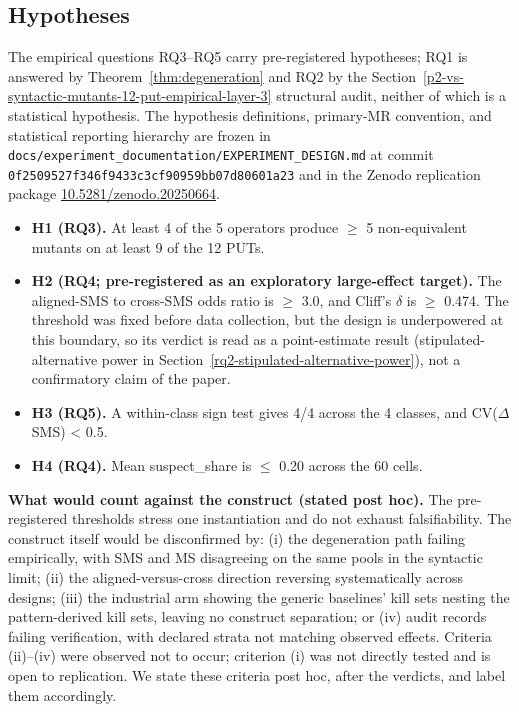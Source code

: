 \documentclass[manuscript,screen,review]{acmart}
\begin{document}
\subsection{Hypotheses}\label{hypotheses}

The empirical questions RQ3--RQ5 carry pre-registered hypotheses; RQ1 is
answered by Theorem~\ref{thm:degeneration} and RQ2 by the Section~\ref{p2-vs-syntactic-mutants-12-put-empirical-layer-3} structural audit, neither of
which is a statistical hypothesis.
The hypothesis definitions, primary-MR convention, and statistical
reporting hierarchy are frozen in
\texttt{docs/experiment\_documentation/EXPERIMENT\_DESIGN.md} at commit
\texttt{0f2509527f346f9433c3cf90959bb07d80601a23} and in the Zenodo
replication package
\href{https://doi.org/10.5281/zenodo.20250664}{10.5281/zenodo.20250664}.

\begin{itemize}

\item
  \textbf{H1 (RQ3).} At least 4 of the 5 operators produce $\geq$ 5 non-equivalent
  mutants on at least 9 of the 12 PUTs.
\item
  \textbf{H2 (RQ4; pre-registered as an exploratory large-effect
  target).} The aligned-SMS to
  cross-SMS odds ratio is $\geq$ 3.0, and Cliff's $\delta$ is $\geq$ 0.474.
  The threshold was fixed before data collection, but the design is
  underpowered at this boundary, so its verdict is read as a
  point-estimate result
  (stipulated-alternative power in Section~\ref{rq2-stipulated-alternative-power}), not
  a confirmatory claim of the paper.
\item
  \textbf{H3 (RQ5).} A within-class sign test gives 4/4 across the 4 classes,
  and CV($\Delta$SMS) \textless{} 0.5.
\item
  \textbf{H4 (RQ4).} Mean suspect\_share is $\leq$ 0.20 across the 60 cells.
\end{itemize}

\textbf{What would count against the construct (stated post hoc).} The
pre-registered thresholds stress one instantiation and do not exhaust
falsifiability. The construct itself would be disconfirmed by: (i) the
degeneration path failing empirically, with SMS and MS disagreeing on
the same pools in the syntactic limit; (ii) the aligned-versus-cross
direction reversing systematically across designs; (iii) the industrial
arm showing the generic baselines' kill sets nesting the pattern-derived
kill sets, leaving no construct separation; or (iv) audit records failing
verification, with declared strata not matching observed effects. Criteria
(ii)--(iv) were observed not to occur; criterion (i) was not directly
tested and is open to replication. We state these criteria post hoc,
after the verdicts, and label them accordingly.
\end{document}
